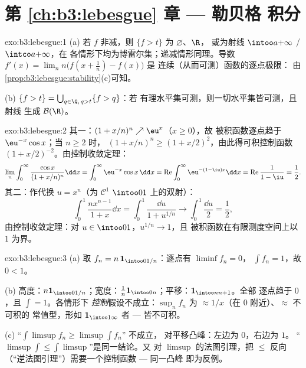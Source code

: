 \section*{第 \ref{ch:b3:lebesgue} 章 --- 勒贝格
积分}

\begin{solution}{exo:b3:lebesgue:1}
(a) 若 $f$ 非减，则 $\{f > t\}$ 为 $\varnothing$、$\R$，
或为射线 $\intoo a{+\infty}$ / $\intco a{+\infty}$，在
各情形下均为博雷尔集；递减情形同理。导数 $f'(x) =
\lim_n n\bigl(f(x + \frac1n) - f(x)\bigr)$ 是
连续（从而可测）函数的逐点极限：
由\cref{prop:b3:lebesgue:stability}(c)可知。

(b) $\{f > t\} = \bigcup_{q \in \Q,\, q > t}\{f > q\}$：若
有理水平集可测，则一切水平集皆可测，且射线
生成 $\mathcal B(\R)$。
\end{solution}

\begin{solution}{exo:b3:lebesgue:2}
其一：$(1 + x/n)^n \nearrow \eu^x$（$x \geq 0$），故
被积函数逐点趋于 $\eu^{-x}\cos x$；当 $n \geq 2$ 时，
$(1 + x/n)^n \geq (1 + x/2)^2$，由此得可积控制函数
$(1 + x/2)^{-2}$。由控制收敛定理：
\[
\lim_n\int_0^\infty\frac{\cos x}{(1 + x/n)^n}\dd x
= \int_0^\infty \eu^{-x}\cos x\,\dd x
= \operatorname{Re}\int_0^\infty\eu^{-(1 - \iu)x}\dd x
= \operatorname{Re}\frac{1}{1 - \iu} = \frac12 .
\]
其二：作代换 $u = x^n$（为 $\mathcal C^1$
$\intoo01$ 上的双射）：
\[
\int_0^1\frac{nx^{n-1}}{1 + x}\dd x = \int_0^1\frac{\dd u}{1 +
u^{1/n}} \longrightarrow \int_0^1\frac{\dd u}{2} = \frac12,
\]
由控制收敛定理：对 $u \in \intoo01$，$u^{1/n} \to 1$，且
被积函数在有限测度空间上以 $1$ 为界。
\end{solution}

\begin{solution}{exo:b3:lebesgue:3}
(a) 取 $f_n = n\,\mathbf 1_{\intoo0{1/n}}$：逐点有 $\liminf f_n = 0$，
$\int f_n = 1$，故 $0 < 1$。

(b) 高度：$n\mathbf 1_{\intoo0{1/n}}$；宽度：$\frac1n\mathbf
1_{\intoo0n}$；平移：$\mathbf 1_{\intoo n{n+1}}$。全部
逐点趋于 $0$，且 $\int = 1$。各情形下
\emph{控制}假设不成立：$\sup_nf_n$ 为
$\approx 1/x$（在 $0$ 附近）、$\approx$ 不可积的
常值型，形如 $\mathbf 1_{\intoo1\infty}$ 者 --- 皆不可积。

(c) “$\int\limsup f_n \geq \limsup\int f_n$” 不成立，
对平移凸峰：左边为 $0$，右边为 $1$。
“$\limsup\int \leq \int\limsup$”是同一结论。又
对 $\limsup$ 的法图引理，把 $\leq$ 反向
（“逆法图引理”）需要一个控制函数 --- 同一凸峰
即为反例。
\end{solution}

